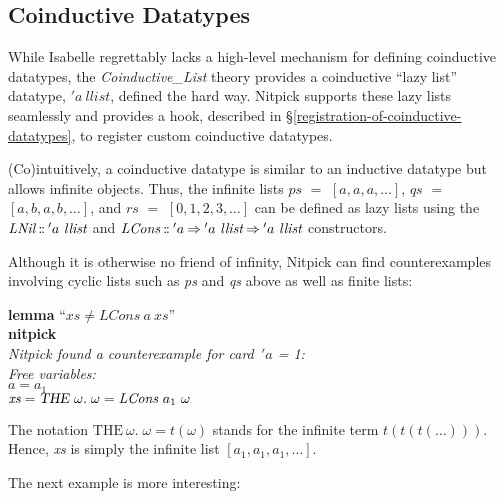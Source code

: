\documentclass[a4paper,12pt]{article}
\def\Colon{\mathord{:\mkern-1.5mu:}}
\begin{document}
\subsection{Coinductive Datatypes}
\label{coinductive-datatypes}

While Isabelle regrettably lacks a high-level mechanism for defining coinductive
datatypes, the \textit{Coinductive\_List} theory provides a coinductive ``lazy
list'' datatype, $'a~\textit{llist}$, defined the hard way. Nitpick supports
these lazy lists seamlessly and provides a hook, described in
\S\ref{registration-of-coinductive-datatypes}, to register custom coinductive
datatypes.

(Co)intuitively, a coinductive datatype is similar to an inductive datatype but
allows infinite objects. Thus, the infinite lists $\textit{ps}$ $=$ $[a, a, a,
\ldots]$, $\textit{qs}$ $=$ $[a, b, a, b, \ldots]$, and $\textit{rs}$ $=$ $[0,
1, 2, 3, \ldots]$ can be defined as lazy lists using the
$\textit{LNil}\mathbin{\Colon}{'}a~\textit{llist}$ and
$\textit{LCons}\mathbin{\Colon}{'}a \mathbin{\Rightarrow} {'}a~\textit{llist}
\mathbin{\Rightarrow} {'}a~\textit{llist}$ constructors.

Although it is otherwise no friend of infinity, Nitpick can find counterexamples
involving cyclic lists such as \textit{ps} and \textit{qs} above as well as
finite lists:

\prew
\textbf{lemma} ``$\textit{xs} \not= \textit{LCons}~a~\textit{xs}$'' \\
\textbf{nitpick} \\[2\smallskipamount]
\slshape Nitpick found a counterexample for {\itshape card}~$'a$ = 1: \\[2\smallskipamount]
\hbox{}\qquad Free variables: \nopagebreak \\
\hbox{}\qquad\qquad $\textit{a} = a_1$ \\
\hbox{}\qquad\qquad $\textit{xs} = \textsl{THE}~\omega.\; \omega = \textit{LCons}~a_1~\omega$
\postw

The notation $\textrm{THE}~\omega.\; \omega = t(\omega)$ stands
for the infinite term $t(t(t(\ldots)))$. Hence, \textit{xs} is simply the
infinite list $[a_1, a_1, a_1, \ldots]$.

The next example is more interesting:
\end{document}
